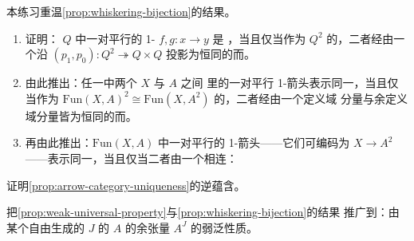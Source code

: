 \begin{exercise}\label{ex:arrow-representations}
本练习重温\cref{prop:whiskering-bijection}的结果。
\begin{enumerate}[label=(\roman*)]
\item 证明：\trQuasiCategory{} $Q$ 中一对平行的 1-\trSimplex{} $f,g\colon x\to y$ 是%
\trHomotopic{}，当且仅当作为 $Q^{2}$ 的\trElement{}，二者经由一个沿 $(p_{1},p_{0})\colon Q^{2}\twoheadrightarrow Q\times Q$%
投影为恒同的\trIsomorphism{}而\trIsomorphism{}。
\item 由此推出：任一\trInfinityCosmos{}中两个\trInfinityCategory{} $X$ 与 $A$ 之间%
\trFunctorSpace{}里的一对平行 1-箭头表示同一\trNaturalTransformation{}，当且仅当作为%
$\mathrm{Fun}(X,A)^{2}\cong\mathrm{Fun}(X,A^{2})$ 的\trElement{}，二者经由一个定义域%
分量与余定义域分量皆为恒同的\trIsomorphism{}而\trIsomorphism{}。
\item 再由此推出：$\mathrm{Fun}(X,A)$ 中一对平行的 1-箭头——它们可编码为\trFunctor{}%
$X\to A^{2}$——表示同一\trNaturalTransformation{}，当且仅当二者由一个\trFiberedIsomorphism{}相连：%
\begin{center}
\end{center}
\end{enumerate}
\end{exercise}

\begin{exercise}\label{ex:converse-of-uniqueness}
证明\cref{prop:arrow-category-uniqueness}的逆蕴含。
\end{exercise}

\begin{exercise}\label{ex:cotensor-weak-universal-property}
把\cref{prop:weak-universal-property}与\cref{prop:whiskering-bijection}的结果
推广到：由某个\trReflexiveDirectedGraph{}自由生成的\trCategory{} $J$ 的%
\trInfinityCategory{} $A$ 的余张量 $A^J$ 的弱泛性质。
\end{exercise}

